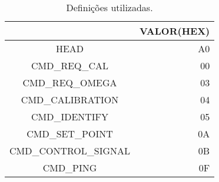 \begin{table}[H]
\centering
\begin{tabular}{c|r}
\hline
\rowcolor[HTML]{C0C0C0} 
\multicolumn{1}{|c|}{\cellcolor[HTML]{C0C0C0}DEFINIÇÕES} & \multicolumn{1}{r|}{\cellcolor[HTML]{C0C0C0}VALOR(HEX)} \\ \hline
HEAD & A0 \\
\rowcolor[HTML]{EFEFEF} 
CMD\_REQ\_CAL & 00 \\
CMD\_REQ\_OMEGA & 03 \\
\rowcolor[HTML]{EFEFEF} 
CMD\_CALIBRATION & 04 \\
CMD\_IDENTIFY & 05 \\
\rowcolor[HTML]{EFEFEF} 
CMD\_SET\_POINT & 0A \\
CMD\_CONTROL\_SIGNAL & 0B \\
\rowcolor[HTML]{EFEFEF} 
CMD\_PING & 0F
\end{tabular}
\caption{Definições utilizadas.}
\label{tab:defines}
\end{table}